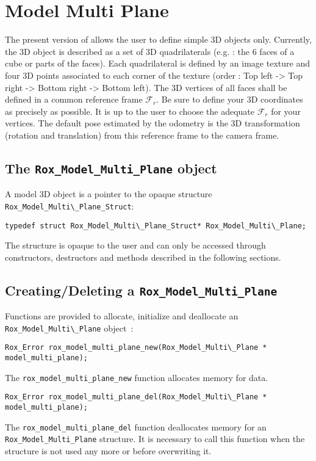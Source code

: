 \section{Model Multi Plane}
\label{sec:model_multi_plane}
The present version of \rox{} allows the user to define simple 3D objects only.
Currently, the 3D object is described as a set of 3D quadrilaterals (e.g. : the 6 
faces of a cube or parts of the faces). Each quadrilateral is defined by an image 
texture and four 3D points associated to each corner of the texture (order : Top left -> Top
right -> Bottom right -> Bottom left). The 3D vertices of all faces shall be defined 
in a common reference frame $\mathcal{F}_{r}$. Be sure to define your 3D coordinates 
as precisely as possible. It is up to the user to choose the adequate $\mathcal{F}_{r}$ for your vertices.
The default pose estimated by the odometry is the 3D transformation 
(rotation and translation) from this reference frame to the camera frame. 

\subsection{The {\tt Rox\_Model\_Multi\_Plane} object}
\label{sse:model_multi_plane_struct}
A model 3D object is a pointer to the opaque structure \lstinline$Rox_Model_Multi\_Plane_Struct$: 

\begin{lstlisting}
typedef struct Rox_Model_Multi\_Plane_Struct* Rox_Model_Multi\_Plane;
\end{lstlisting}

The structure is opaque to the user and can only be accessed through constructors, destructors and methods described in the following sections.

\subsection{Creating/Deleting a {\tt Rox\_Model\_Multi\_Plane}}
\label{sse:model_multi_plane_newdel}

Functions are provided to allocate, initialize and deallocate an \lstinline$Rox_Model_Multi\_Plane$ object~:
\begin{lstlisting}
Rox_Error rox_model_multi_plane_new(Rox_Model_Multi\_Plane * model_multi_plane);
\end{lstlisting}
The \lstinline$rox_model_multi_plane_new$ function allocates memory for data. \\ 

\begin{lstlisting}
Rox_Error rox_model_multi_plane_del(Rox_Model_Multi\_Plane * model_multi_plane);
\end{lstlisting}
The \lstinline$rox_model_multi_plane_del$ function deallocates memory for an \lstinline$Rox_Model_Multi_Plane$ structure. It is necessary to call this function when the
structure is not used any more or before overwriting it.

